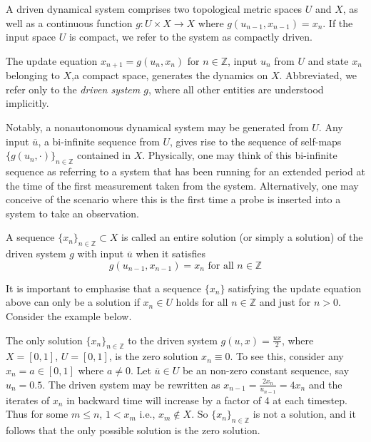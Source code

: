 \begin{Definition}
  \label{Dfn_DDS} \rm
A driven dynamical system comprises two topological metric spaces $U$ and $X$, as well as  a continuous function  ${g:U\times{X}\to{X}}$ where ${g(u_{n-1}, x_{n-1})=x_{n}}$.
If the input space $U$ is compact, we refer to the system as compactly driven. 
\end{Definition}

The update equation $x_{n+1} = g(u_n,x_n)$ for $n \in\mathbb{Z}$, input $u_n$ from $U$ and state $x_n$ belonging to $X$,a compact space, generates the dynamics on $X$. 
Abbreviated, we refer only to the \textit{driven system $g$}, where all other entities are understood implicitly.

Notably, a nonautonomous dynamical system may be generated from $U$. Any input $\overline{u}$, a bi-infinite sequence from $U$, gives rise to the sequence of self-maps ${\{g(u_n, \cdot)\}}_{n\in\mathbb{Z}}$ contained in $X$.
Physically, one may think of this bi-infinite sequence as referring to a system that has been running for an extended period at the time of the first measurement taken from the system. Alternatively, one may conceive of the scenario where this is the first time a probe is inserted into a system to take an observation.

\begin{Definition}
  \label{Dfn_Soln} \rm
  A sequence ${\{x_n\}}_{n\in\mathbb{Z}}\subset X$ is called an entire solution (or simply a solution) of the driven system  $g$ with input $\overline{u}$ when it satisfies 
  \begin{equation}
    g(u_{n-1}, x_{n-1})=x_n \text{ for all }n\in\mathbb{Z}
  \end{equation}
  
\end{Definition}

It is important to emphasise that a sequence $\{x_n\}$ satisfying the update equation above can only be a solution if $x_n\in{U}$ holds for all $n\in\mathbb{Z}$ and just for $n>0$. Consider the example below.

\begin{Example}\label{ex_halfux}\rm
  The only solution  ${\{x_n\}}_{n\in\mathbb{Z}}$ to the driven system  $g(u,x)=\frac{ux}{2}$, where $X=[0,1]$, $U=[0,1]$,  is the zero solution $x_n\equiv0$.
  To see this, consider any $x_n=a\in[0,1]$ where $a\neq{0}$.  Let $\overline{u}\in{U}$ be an non-zero constant sequence, say $u_n=0.5$. 
  The driven system may be rewritten as $x_{n-1}=\frac{2x_n}{u_{n-1}}=4x_n$ and the  iterates of $x_n$ in backward time will increase by a factor of 4 at each timestep. 
  Thus for some $m\leq{n}$,  $1<x_m$ i.e., $x_m\notin{X}$. So ${\{x_n\}}_{n\in\mathbb{Z}}$ is not a solution, and it follows that the only possible solution is the zero solution.
\end{Example}

